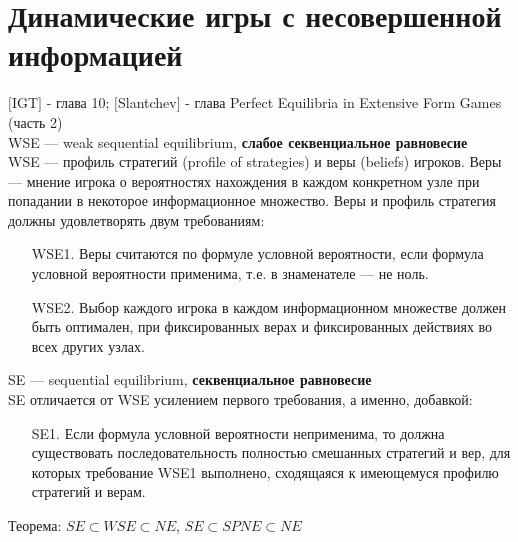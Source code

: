 \documentclass[pdftex,12pt,a4paper]{article}
\providecommand{\indef}[1]{\textbf{#1}}
\begin{document}
\section{Динамические игры с несовершенной информацией} 

$[$IGT$]$ - глава 10; $[$Slantchev$]$ - 
глава Perfect Equilibria in Extensive Form Games (часть 2) \\

WSE --- weak sequential equilibrium, \indef{слабое секвенциальное равновесие}\\
WSE ---  профиль стратегий (profile of strategies) и веры (beliefs) игроков. Веры --- мнение игрока о вероятностях нахождения в каждом конкретном узле при попадании в некоторое информационное множество. Веры и профиль стратегия должны удовлетворять двум требованиям:
\begin{enumerate}
\item[WSE1.] \label{wse1} Веры считаются по формуле условной вероятности, если формула условной вероятности применима, т.е. в знаменателе --- не ноль.
\item[WSE2.] Выбор каждого игрока в каждом информационном множестве должен быть оптимален, при фиксированных верах и фиксированных действиях во всех других узлах.
\end{enumerate}

SE --- sequential equilibrium, \indef{секвенциальное равновесие} \\
SE отличается от WSE усилением первого требования, а именно, добавкой: 
\begin{enumerate}
\item[SE1.] Если формула условной вероятности неприменима, то должна существовать последовательность полностью смешанных стратегий и вер, для которых требование WSE1 выполнено, сходящаяся к имеющемуся профилю стратегий и верам.
\end{enumerate}

Теорема: $SE\subset WSE \subset NE$, $SE\subset SPNE \subset NE$

\begin{comment}
\begin{tikzpicture}
\node[draw, circle] at (0,0) {$SE$};
\node[draw, circle,minimum width=3cm] at (-1,0) {$SPNE$};
\node[draw, circle,minimum width=3cm] at (1,0) {$WSE$};
\end{tikzpicture}  
\end{comment}
\end{document}
